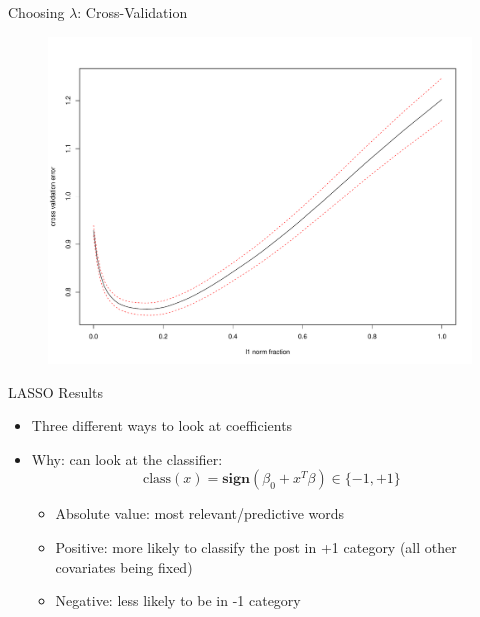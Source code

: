 \documentclass[12pt]{beamer}
\newcommand{\1}[1]{{\mathbf 1}\left\{#1\right\}}        %
\begin{document}
\begin{frame}{Choosing $\lambda$: Cross-Validation}

\begin{figure}
  \centering
  \includegraphics[height=0.9\textheight]{./../../lassoResults/CVPosErr.pdf} 
\end{figure}

\end{frame}


\begin{frame}{LASSO Results} 

\begin{itemize}[<+->]
\item Three different ways to look at coefficients
\item Why: can look at the classifier:
\[
\text{class}(x) = \textbf{sign}(\beta_0+x^T\beta)\in\{-1,+1\}
\]
	\begin{itemize}
	\item Absolute value: most relevant/predictive words
	\item Positive: more likely to classify the post in +1 category (all other covariates being fixed)
	\item Negative: less likely to be in -1 category	
	\end{itemize}
	
\end{itemize}

\end{frame}
\end{document}
